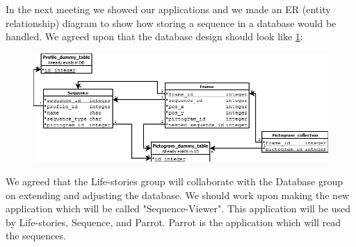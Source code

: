 In the next meeting we showed our applications and we made an ER (entity relationship) diagram to show how storing a sequence in a database would be handled.
We agreed upon that the database design should look like \ref{fig:Sequence-tables}:
\begin{figure}
\centering
\includegraphics[width=0.7\linewidth]{Pics/Sprint2/Sequence-tables}
\caption[An ER diagram that should be included into the overall database]{}
\caption{}
\label{fig:Sequence-tables}
\end{figure}
We agreed that the Life-stories group will collaborate with the Database group on extending and adjusting the database.
We should work upon making the new application which will be called "Sequence-Viewer". This application will be used by Life-stories, Sequence, and Parrot. Parrot is the application which will read the sequences. 